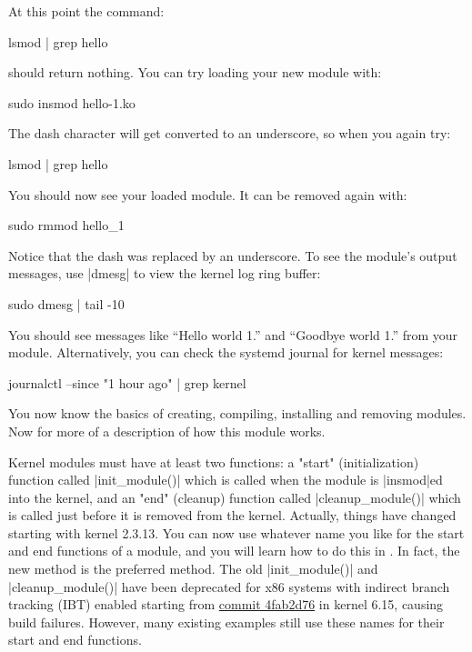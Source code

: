 \documentclass[10pt, oneside]{book}
\begin{document}
At this point the command:
\begin{codebash}
lsmod | grep hello
\end{codebash}

should return nothing.
You can try loading your new module with:
\begin{codebash}
sudo insmod hello-1.ko
\end{codebash}

The dash character will get converted to an underscore, so when you again try:
\begin{codebash}
lsmod | grep hello
\end{codebash}

You should now see your loaded module. It can be removed again with:
\begin{codebash}
sudo rmmod hello_1
\end{codebash}

Notice that the dash was replaced by an underscore.
To see the module's output messages, use \sh|dmesg| to view the kernel log ring buffer:
\begin{codebash}
sudo dmesg | tail -10
\end{codebash}

You should see messages like ``Hello world 1.'' and ``Goodbye world 1.'' from your module.
Alternatively, you can check the systemd journal for kernel messages:
\begin{codebash}
journalctl --since "1 hour ago" | grep kernel
\end{codebash}

You now know the basics of creating, compiling, installing and removing modules.
Now for more of a description of how this module works.

Kernel modules must have at least two functions: a "start" (initialization) function called \cpp|init_module()| which is called when the module is \sh|insmod|ed into the kernel,
and an "end" (cleanup) function called \cpp|cleanup_module()| which is called just before it is removed from the kernel.
Actually, things have changed starting with kernel 2.3.13.
You can now use whatever name you like for the start and end functions of a module,
and you will learn how to do this in .
In fact, the new method is the preferred method.
The old \cpp|init_module()| and \cpp|cleanup_module()| have been deprecated for x86 systems with indirect branch tracking (IBT) enabled starting from \href{https://github.com/torvalds/linux/commit/4fab2d76}{commit 4fab2d76} in kernel 6.15, causing build failures.
However, many existing examples still use these names for their start and end functions.
\end{document}
